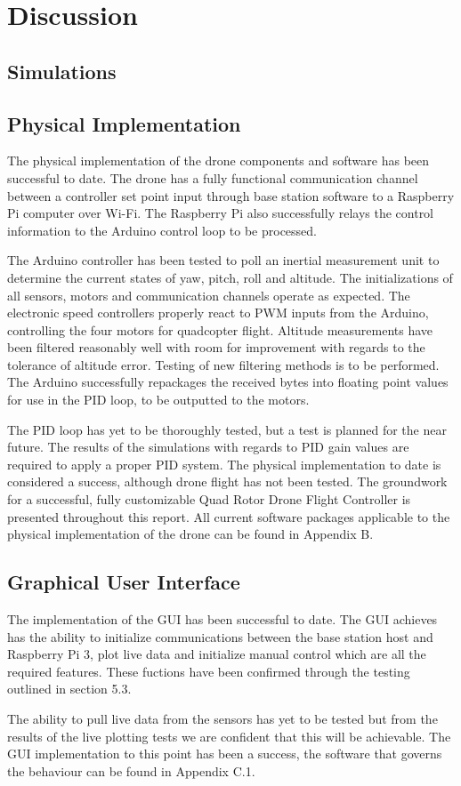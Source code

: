 
\section{Discussion}
\subsection{Simulations}
\label{discussion:sim}

\subsection{Physical Implementation}

The physical implementation of the drone components and software has been successful to date. The drone has a fully functional communication channel between a controller set point input through base station software to a Raspberry Pi computer over Wi-Fi. The Raspberry Pi also successfully relays the control information to the Arduino control loop to be processed.

The Arduino controller has been tested to poll an inertial measurement unit to determine the current states of yaw, pitch, roll and altitude. The initializations of all sensors, motors and communication channels operate as expected. The electronic speed controllers properly react to PWM inputs from the Arduino, controlling the four motors for quadcopter flight. Altitude measurements have been filtered reasonably well with room for improvement with regards to the tolerance of altitude error. Testing of new filtering methods is to be performed. The Arduino successfully repackages the received bytes into floating point values for use in the PID loop, to be outputted to the motors.

The PID loop has yet to be thoroughly tested, but a test is planned for the near future. The results of the simulations with regards to PID gain values are required to apply a proper PID system. The physical implementation to date is considered a success, although drone flight has not been tested. The groundwork for a successful, fully customizable Quad Rotor Drone Flight Controller is presented throughout this report. All current software packages applicable to the physical implementation of the drone can be found in  Appendix B.

\subsection{Graphical User Interface}
The implementation of the GUI has been successful to date. The GUI achieves has the ability to initialize communications between the base station host and Raspberry Pi 3, plot live data and initialize manual control which are all the required features. These fuctions have been confirmed through the testing outlined in section 5.3.

The ability to pull live data from the sensors has yet to be tested but from the results of the live plotting tests we are confident that this will be achievable. The GUI implementation to this point has been a success, the software that governs the behaviour can be found in Appendix C.1.


